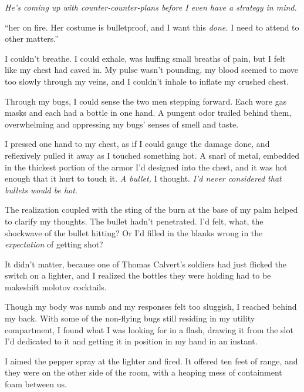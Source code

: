 \emph{He's coming up with counter-counter-plans before I even have a strategy in mind.}



``\ldotsSet her on fire.  Her costume is bulletproof, and I want this \emph{done.  }I need to attend to other matters.''



I couldn't breathe.  I could exhale, was huffing small breaths of pain, but I felt like my chest had caved in.  My pulse wasn't pounding, my blood seemed to move too slowly through my veins, and I couldn't inhale to inflate my crushed chest.



Through my bugs, I could sense the two men stepping forward.  Each wore gas masks and each had a bottle in one hand.  A pungent odor trailed behind them, overwhelming and oppressing my bugs' senses of smell and taste.



I pressed one hand to my chest, as if I could gauge the damage done, and reflexively pulled it away as I touched something hot.  A snarl of metal, embedded in the thickest portion of the armor I'd designed into the chest, and it was hot enough that it hurt to touch it.  \emph{A bullet,} I thought.  \emph{I'd never considered that bullets would be hot}.



The realization coupled with the sting of the burn at the base of my palm helped to clarify my thoughts.  The bullet hadn't penetrated.  I'd felt, what, the shockwave of the bullet hitting?  Or I'd filled in the blanks wrong in the \emph{expectation} of getting shot?



It didn't matter, because one of Thomas Calvert's soldiers had just flicked the switch on a lighter, and I realized the bottles they were holding had to be makeshift molotov cocktails.



Though my body was numb and my responses felt too sluggish, I reached behind my back.  With some of the non-flying bugs still residing in my utility compartment, I found what I was looking for in a flash, drawing it from the slot I'd dedicated to it and getting it in position in my hand in an instant.



I aimed the pepper spray at the lighter and fired.  It offered ten feet of range, and they were on the other side of the room, with a heaping mess of containment foam between us.



